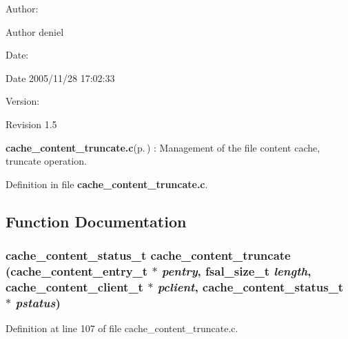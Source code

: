 \begin{Desc}
\item[Author:]\begin{Desc}
\item[Author]deniel \end{Desc}
\end{Desc}
\begin{Desc}
\item[Date:]\begin{Desc}
\item[Date]2005/11/28 17:02:33 \end{Desc}
\end{Desc}
\begin{Desc}
\item[Version:]\begin{Desc}
\item[Revision]1.5 \end{Desc}
\end{Desc}
{\bf cache\_\-content\_\-truncate.c}{\rm (p.\,\pageref{cache__content__truncate_8c})} : Management of the file content cache, truncate operation.

Definition in file {\bf cache\_\-content\_\-truncate.c}.

\subsection{Function Documentation}
\subsubsection{\setlength{\rightskip}{0pt plus 5cm}cache\_\-content\_\-status\_\-t cache\_\-content\_\-truncate (cache\_\-content\_\-entry\_\-t $\ast$ {\em pentry}, fsal\_\-size\_\-t {\em length}, cache\_\-content\_\-client\_\-t $\ast$ {\em pclient}, cache\_\-content\_\-status\_\-t $\ast$ {\em pstatus})}\label{cache__content__truncate_8c_a0}




Definition at line 107 of file cache\_\-content\_\-truncate.c.
